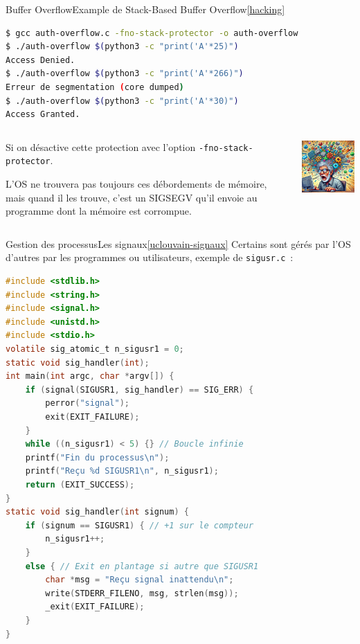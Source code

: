 \documentclass{beamer}
\begin{document}
    \begin{frame}[fragile]{Buffer Overflow}{Example de Stack-Based Buffer Overflow\cref{hacking}}
        \begin{lstlisting}[language=bash]
$ gcc auth-overflow.c -fno-stack-protector -o auth-overflow
$ ./auth-overflow $(python3 -c "print('A'*25)")
Access Denied.
$ ./auth-overflow $(python3 -c "print('A'*266)")
Erreur de segmentation (core dumped)
$ ./auth-overflow $(python3 -c "print('A'*30)")
Access Granted.
        \end{lstlisting}
        \bigbreak
        \begin{columns}
            \begin{column}{0.6\textwidth}
                Si on désactive cette protection avec l'option \lstinline{-fno-stack-protector}.
                \begin{dangercolorbox}
                    L'OS ne trouvera pas toujours ces débordements de mémoire, mais quand il les trouve, c'est un SIGSEGV qu'il envoie au programme dont la mémoire est corrompue.
                \end{dangercolorbox}
            \end{column}
            \begin{column}{0.4\textwidth}
                \includegraphics[width=5cm]{image/old-programmer-exploding}
            \end{column}
        \end{columns}
    \end{frame}

    \begin{frame}[fragile]{Gestion des processus}{Les signaux\cref{uclouvain-signaux}}
        Certains sont gérés par l'OS d'autres par les programmes ou utilisateurs, exemple de \lstinline{sigusr.c}~:
        \begin{lstlisting}[language=C,basicstyle=\tiny\ttfamily]
#include <stdlib.h>
#include <string.h>
#include <signal.h>
#include <unistd.h>
#include <stdio.h>
volatile sig_atomic_t n_sigusr1 = 0;
static void sig_handler(int);
int main(int argc, char *argv[]) {
    if (signal(SIGUSR1, sig_handler) == SIG_ERR) {
        perror("signal");
        exit(EXIT_FAILURE);
    }
    while ((n_sigusr1) < 5) {} // Boucle infinie
    printf("Fin du processus\n");
    printf("Reçu %d SIGUSR1\n", n_sigusr1);
    return (EXIT_SUCCESS);
}
static void sig_handler(int signum) {
    if (signum == SIGUSR1) { // +1 sur le compteur
        n_sigusr1++;
    }
    else { // Exit en plantage si autre que SIGUSR1
        char *msg = "Reçu signal inattendu\n";
        write(STDERR_FILENO, msg, strlen(msg));
        _exit(EXIT_FAILURE);
    }
}
        \end{lstlisting}
    \end{frame}
\end{document}
